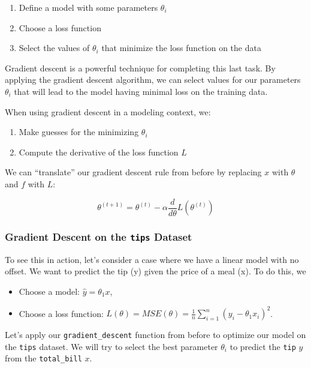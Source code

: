 \documentclass[
  letterpaper,
  DIV=11,
  numbers=noendperiod]{scrreprt}
\providecommand{\tightlist}{%
  \setlength{\itemsep}{0pt}\setlength{\parskip}{0pt}}\usepackage{longtable,booktabs,array}
\begin{document}
\begin{enumerate}
\def\labelenumi{\arabic{enumi}.}
\tightlist
\item
  Define a model with some parameters \(\theta_i\)
\item
  Choose a loss function
\item
  Select the values of \(\theta_i\) that minimize the loss function on
  the data
\end{enumerate}

Gradient descent is a powerful technique for completing this last task.
By applying the gradient descent algorithm, we can select values for our
parameters \(\theta_i\) that will lead to the model having minimal loss
on the training data.

When using gradient descent in a modeling context, we:

\begin{enumerate}
\def\labelenumi{\arabic{enumi}.}
\tightlist
\item
  Make guesses for the minimizing \(\theta_i\)
\item
  Compute the derivative of the loss function \(L\)
\end{enumerate}

We can ``translate'' our gradient descent rule from before by replacing
\(x\) with \(\theta\) and \(f\) with \(L\):

\[\theta^{(t+1)} = \theta^{(t)} - \alpha \frac{d}{d\theta} L(\theta^{(t)})\]

\subsubsection{\texorpdfstring{Gradient Descent on the \texttt{tips}
Dataset}{Gradient Descent on the tips Dataset}}\label{gradient-descent-on-the-tips-dataset}

To see this in action, let's consider a case where we have a linear
model with no offset. We want to predict the tip (y) given the price of
a meal (x). To do this, we

\begin{itemize}
\tightlist
\item
  Choose a model: \(\hat{y} = \theta_1 x\),
\item
  Choose a loss function:
  \(L(\theta) = MSE(\theta) = \frac{1}{n} \sum_{i=1}^n (y_i - \theta_1x_i)^2\).
\end{itemize}

Let's apply our \texttt{gradient\_descent} function from before to
optimize our model on the \texttt{tips} dataset. We will try to select
the best parameter \(\theta_i\) to predict the \texttt{tip} \(y\) from
the \texttt{total\_bill} \(x\).
\end{document}
